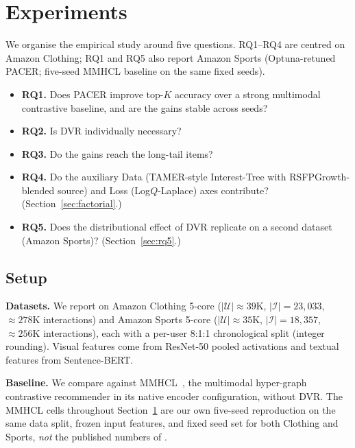\documentclass[conference]{IEEEtran}
\newcommand{\Ucal}{\mathcal{U}}
\newcommand{\Ical}{\mathcal{I}}
\newcommand{\dvr}{DVR\xspace}
\begin{document}
\section{Experiments}
\label{sec:results}

We organise the empirical study around five questions. RQ1--RQ4 are
centred on Amazon Clothing; RQ1 and RQ5 also report Amazon Sports
(Optuna-retuned PACER; five-seed MMHCL baseline on the same fixed
seeds).
\begin{itemize}[leftmargin=1.2em,itemsep=1pt,topsep=1pt]
  \item \textbf{RQ1.} Does PACER improve top-$K$ accuracy over a strong
        multimodal contrastive baseline, and are the gains stable
        across seeds?
  \item \textbf{RQ2.} Is \dvr individually necessary?
  \item \textbf{RQ3.} Do the gains reach the long-tail items?
  \item \textbf{RQ4.} Do the auxiliary Data (TAMER-style Interest-Tree with RSFPGrowth-blended source) and Loss
        (Log$Q$-Laplace) axes contribute? (Section~\ref{sec:factorial}.)
  \item \textbf{RQ5.} Does the distributional effect of \dvr
        replicate on a second dataset (Amazon Sports)?
        (Section~\ref{sec:rq5}.)
\end{itemize}

\subsection{Setup}
\label{sec:setup}

\noindent\textbf{Datasets.} We report on Amazon Clothing 5-core
($|\Ucal| \approx 39\text{K}$, $|\Ical| = 23{,}033$,
$\approx\!278\text{K}$ interactions) and Amazon Sports 5-core
($|\Ucal| \approx 35\text{K}$, $|\Ical| = 18{,}357$,
$\approx\!256\text{K}$ interactions), each with a per-user 8:1:1
chronological split (integer rounding). Visual features come from
ResNet-50 pooled activations and textual features from Sentence-BERT.

\noindent\textbf{Baseline.} We compare against MMHCL~\cite{guo2025mmhcl},
the multimodal hyper-graph contrastive recommender in its native
encoder configuration, without \dvr. The MMHCL cells throughout
Section~\ref{sec:results} are our own five-seed reproduction on
the same data split, frozen input features, and fixed seed set for
both Clothing and Sports,
\emph{not} the published numbers of
\cite[Table~4]{guo2025mmhcl}.
\end{document}
